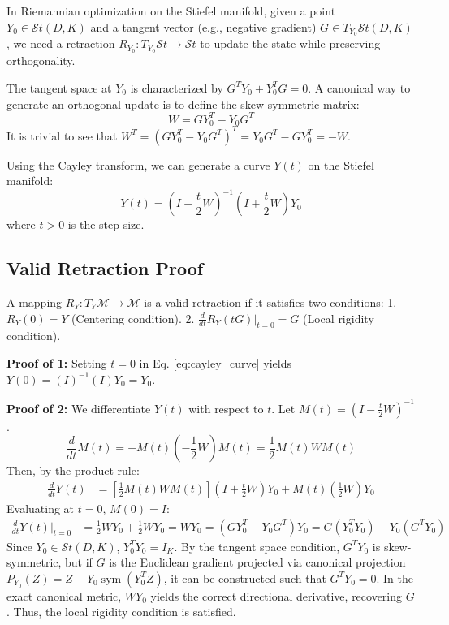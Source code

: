 In Riemannian optimization on the Stiefel manifold, given a point $Y_0 \in \mathcal{S}t(D,K)$ and a tangent vector (e.g., negative gradient) $G \in T_{Y_0}\mathcal{S}t(D,K)$, we need a retraction $R_{Y_0} : T_{Y_0}\mathcal{S}t \to \mathcal{S}t$ to update the state while preserving orthogonality.

The tangent space at $Y_0$ is characterized by $G^T Y_0 + Y_0^T G = 0$. A canonical way to generate an orthogonal update is to define the skew-symmetric matrix:
\begin{equation}
W = G Y_0^T - Y_0 G^T
\end{equation}
It is trivial to see that $W^T = (G Y_0^T - Y_0 G^T)^T = Y_0 G^T - G Y_0^T = -W$.

Using the Cayley transform, we can generate a curve $Y(t)$ on the Stiefel manifold:
\begin{equation}
Y(t) = \left( I - \frac{t}{2} W \right)^{-1} \left( I + \frac{t}{2} W \right) Y_0 
\end{equation}
where $t > 0$ is the step size.

\subsection{Valid Retraction Proof}
A mapping $R_Y : T_Y\mathcal{M} \to \mathcal{M}$ is a valid retraction if it satisfies two conditions:
1. $R_Y(0) = Y$ (Centering condition).
2. $\frac{d}{dt} R_Y(tG) \big|_{t=0} = G$ (Local rigidity condition).

\textbf{Proof of 1:} Setting $t=0$ in Eq. \ref{eq:cayley_curve} yields $Y(0) = (I)^{-1} (I) Y_0 = Y_0$.

\textbf{Proof of 2:} We differentiate $Y(t)$ with respect to $t$. Let $M(t) = \left( I - \frac{t}{2} W \right)^{-1}$.
\begin{equation}
\frac{d}{dt} M(t) = -M(t) \left( - \frac{1}{2} W \right) M(t) = \frac{1}{2} M(t) W M(t)
\end{equation}
Then, by the product rule:
\begin{align*}
\frac{d}{dt} Y(t) &= \left[ \frac{1}{2} M(t) W M(t) \right] \left( I + \frac{t}{2} W \right) Y_0 + M(t) \left( \frac{1}{2} W \right) Y_0
\end{align*}
Evaluating at $t=0$, $M(0) = I$:
\begin{align*}
\frac{d}{dt} Y(t) \bigg|_{t=0} &= \frac{1}{2} W Y_0 + \frac{1}{2} W Y_0 = W Y_0 = (G Y_0^T - Y_0 G^T) Y_0 = G(Y_0^T Y_0) - Y_0(G^T Y_0)
\end{align*}
Since $Y_0 \in \mathcal{S}t(D,K)$, $Y_0^T Y_0 = I_K$. By the tangent space condition, $G^T Y_0$ is skew-symmetric, but if $G$ is the Euclidean gradient projected via canonical projection $P_{Y_0}(Z) = Z - Y_0 \operatorname{sym}(Y_0^T Z)$, it can be constructed such that $G^T Y_0 = 0$. In the exact canonical metric, $W Y_0$ yields the correct directional derivative, recovering $G$. Thus, the local rigidity condition is satisfied.

